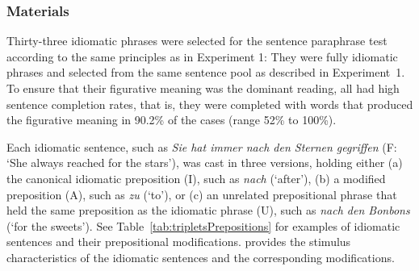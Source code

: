\documentclass[output=paper]{langsci/langscibook}
\begin{document}
\subsubsection{Materials}
Thirty-three idiomatic phrases were selected for the sentence paraphrase test according to the same principles as in Experiment 1: They were fully idiomatic phrases and selected from the same sentence pool as described in Experiment~1.  To ensure that their figurative meaning was the dominant reading, all had high sentence completion rates, that is, they were completed with words that produced the figurative meaning in 90.2\% of the cases (range 52\% to 100\%).

Each idiomatic sentence, such as \textit{Sie hat immer nach den Sternen gegriffen} (F: `She always reached for the stars'), was cast in three versions, holding either (a) the canonical idiomatic preposition (I), such as \textit{nach} (‘after’), (b) a modified preposition (A), such as \textit{zu} (‘to’), or (c) an unrelated prepositional phrase that held the same preposition as the idiomatic phrase (U), such as \textit{nach den Bonbons} (‘for the sweets’). See Table~\ref{tab:tripletsPrepositions} for examples of idiomatic sentences and their prepositional modifications.  provides the stimulus characteristics of the idiomatic sentences and the corresponding modifications.

\begin{table}
\caption{Idiomatic sentences and stimulus characteristics of the idiomatic and modified preposition, and unrelated prepositional phrase in Experiment 3. \textit{Notes:} N = number of items, Lemma = mean lemma frequency per one million, taken from CELEX \citep{baayen:1993}, Closure = mean sentence completion in \%.\label{tab:Table6}}
\end{table}
\end{document}
